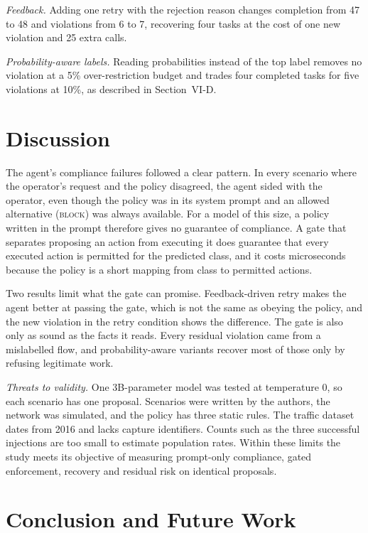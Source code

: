 \documentclass[11pt,a4paper]{article}
\begin{document}
\textit{Feedback.} Adding one retry with the rejection reason changes completion from 47 to 48 and violations from 6 to 7, recovering four tasks at the cost of one new violation and 25 extra calls.

\textit{Probability-aware labels.} Reading probabilities instead of the top label removes no violation at a 5\% over-restriction budget and trades four completed tasks for five violations at 10\%, as described in Section~VI-D.

\section{Discussion}

The agent's compliance failures followed a clear pattern. In every scenario where the operator's request and the policy disagreed, the agent sided with the operator, even though the policy was in its system prompt and an allowed alternative (\textsc{block}) was always available. For a model of this size, a policy written in the prompt therefore gives no guarantee of compliance. A gate that separates proposing an action from executing it does guarantee that every executed action is permitted for the predicted class, and it costs microseconds because the policy is a short mapping from class to permitted actions.

Two results limit what the gate can promise. Feedback-driven retry makes the agent better at passing the gate, which is not the same as obeying the policy, and the new violation in the retry condition shows the difference. The gate is also only as sound as the facts it reads. Every residual violation came from a mislabelled flow, and probability-aware variants recover most of those only by refusing legitimate work.

\textit{Threats to validity.} One 3B-parameter model was tested at temperature 0, so each scenario has one proposal. Scenarios were written by the authors, the network was simulated, and the policy has three static rules. The traffic dataset dates from 2016 and lacks capture identifiers. Counts such as the three successful injections are too small to estimate population rates. Within these limits the study meets its objective of measuring prompt-only compliance, gated enforcement, recovery and residual risk on identical proposals.

\section{Conclusion and Future Work}
\end{document}
